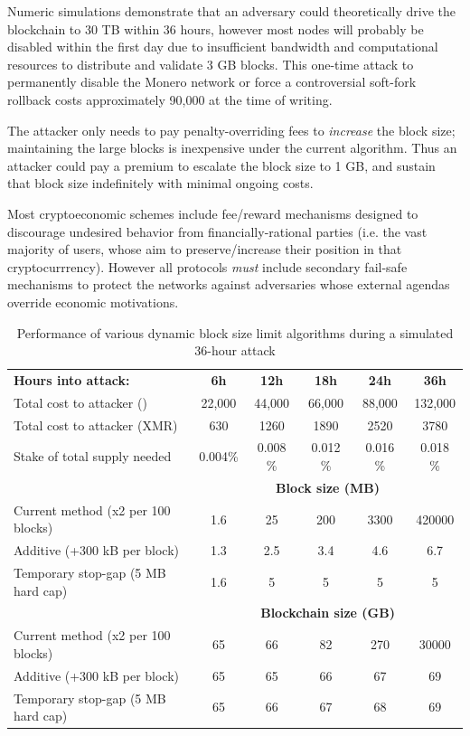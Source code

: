 \documentclass{mrl}
\begin{document}
Numeric simulations demonstrate that an adversary could theoretically drive the blockchain to 30 TB within 36 hours, however most nodes will probably be disabled within the first day due to insufficient bandwidth and computational resources to distribute and validate 3 GB blocks. This one-time attack to permanently disable the Monero network or force a controversial soft-fork rollback costs approximately 90,000\EUR{} at the time of writing.
 
The attacker only needs to pay penalty-overriding fees to \emph{increase} the block size; maintaining the large blocks is inexpensive under the current algorithm. Thus an attacker could pay a premium to escalate the block size to 1 GB, and sustain that block size indefinitely with minimal ongoing costs.
 
Most cryptoeconomic schemes include fee/reward mechanisms designed to discourage undesired behavior from financially-rational parties (i.e. the vast majority of users, whose aim to preserve/increase their position in that cryptocurrrency). However all protocols \textit{must} include secondary fail-safe mechanisms to protect the networks against adversaries whose external agendas override economic motivations.


\begin{table}
\centering 
\begin{tabular}{l | c c c c c} %
\hline
\hline
\textbf{Hours into attack:} & \textbf{6h} & \textbf{12h} & \textbf{18h} & \textbf{24h} & \textbf{36h}\\
Total cost to attacker (\EUR{}) & 22,000 & 44,000 & 66,000 & 88,000 & 132,000\\
Total cost to attacker (XMR) & 630 & 1260 & 1890 & 2520 & 3780 \\
Stake of total supply needed & 0.004\% & 0.008 \% & 0.012 \% & 0.016 \% & 0.018 \% \\
\hline
& \multicolumn{5}{c}{\textbf{Block size (MB)}} \\ 
Current method (x2 per 100 blocks) & 1.6 & 25 & 200 & 3300 & 420000\\
Additive (+300 kB per block) & 1.3 & 2.5 & 3.4 & 4.6 & 6.7 \\
Temporary stop-gap (5 MB hard cap) & 1.6 & 5 & 5 & 5 & 5 \\
& \multicolumn{5}{c}{\textbf{Blockchain size (GB)}} \\ 
Current method (x2 per 100 blocks) & 65 & 66 & 82 & 270 & 30000\\
Additive (+300 kB per block) & 65 & 65 & 66 & 67 & 69 \\
Temporary stop-gap (5 MB hard cap) & 65 & 66 & 67 & 68 & 69 \\
\hline\hline
\end{tabular}
\caption{Performance of various dynamic block size limit algorithms during a simulated 36-hour attack} 
\label{results_table}
\end{table}
\end{document}
